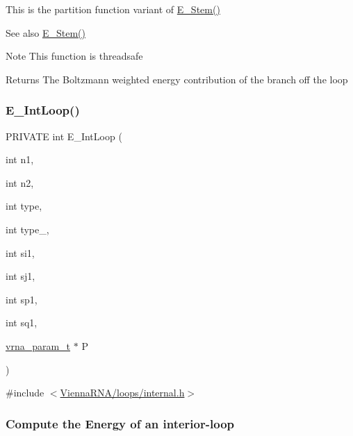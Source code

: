 This is the partition function variant of \hyperlink{group__eval__deprecated_ga51f9851f3500c2aae66674142a6a2dd5}{E\+\_\+\+Stem()} \begin{DoxySeeAlso}{See also}
\hyperlink{group__eval__deprecated_ga51f9851f3500c2aae66674142a6a2dd5}{E\+\_\+\+Stem()} 
\end{DoxySeeAlso}
\begin{DoxyNote}{Note}
This function is threadsafe
\end{DoxyNote}
\begin{DoxyReturn}{Returns}
The Boltzmann weighted energy contribution of the branch off the loop 
\end{DoxyReturn}
\mbox{\label{group__eval__deprecated_gaafbc187b7f78e8e82afb77dd6f3b8fc5}} 
\subsubsection{\texorpdfstring{E\+\_\+\+Int\+Loop()}{E\_IntLoop()}}
{\footnotesize\ttfamily P\+R\+I\+V\+A\+TE int E\+\_\+\+Int\+Loop (\begin{DoxyParamCaption}\item[{int}]{n1,  }\item[{int}]{n2,  }\item[{int}]{type,  }\item[{int}]{type\+\_,  }\item[{int}]{si1,  }\item[{int}]{sj1,  }\item[{int}]{sp1,  }\item[{int}]{sq1,  }\item[{\hyperlink{group__energy__parameters_ga8a69ca7d787e4fd6079914f5343a1f35}{vrna\+\_\+param\+\_\+t} $\ast$}]{P }\end{DoxyParamCaption})}



{\ttfamily \#include $<$\hyperlink{internal_8h}{Vienna\+R\+N\+A/loops/internal.\+h}$>$}

\subsubsection*{Compute the Energy of an interior-\/loop}

